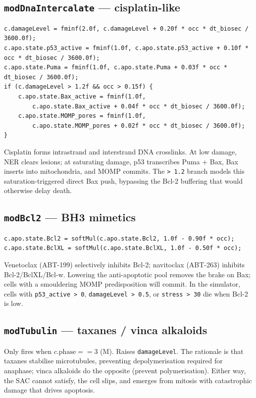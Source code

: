 \documentclass[11pt,letterpaper,twoside,openany]{book}
\newcommand{\code}[1]{\texttt{#1}}
\begin{document}
\subsection{\code{modDnaIntercalate} --- cisplatin-like}

\begin{lstlisting}
c.damageLevel = fminf(2.0f, c.damageLevel + 0.20f * occ * dt_biosec / 3600.0f);
c.apo.state.p53_active = fminf(1.0f, c.apo.state.p53_active + 0.10f * occ * dt_biosec / 3600.0f);
c.apo.state.Puma = fminf(1.0f, c.apo.state.Puma + 0.03f * occ * dt_biosec / 3600.0f);
if (c.damageLevel > 1.2f && occ > 0.15f) {
    c.apo.state.Bax_active = fminf(1.0f,
        c.apo.state.Bax_active + 0.04f * occ * dt_biosec / 3600.0f);
    c.apo.state.MOMP_pores = fminf(1.0f,
        c.apo.state.MOMP_pores + 0.02f * occ * dt_biosec / 3600.0f);
}
\end{lstlisting}
Cisplatin forms intrastrand and interstrand DNA crosslinks. At low
damage, NER clears lesions; at saturating damage, p53 transcribes
Puma + Bax, Bax inserts into mitochondria, and MOMP commits. The
\code{> 1.2} branch models this saturation-triggered direct Bax
push, bypassing the Bcl-2 buffering that would otherwise delay
death.

\subsection{\code{modBcl2} --- BH3 mimetics}

\begin{lstlisting}
c.apo.state.Bcl2 = softMul(c.apo.state.Bcl2, 1.0f - 0.90f * occ);
c.apo.state.BclXL = softMul(c.apo.state.BclXL, 1.0f - 0.50f * occ);
\end{lstlisting}
Venetoclax (ABT-199) selectively inhibits Bcl-2; navitoclax
(ABT-263) inhibits Bcl-2/BclXL/Bcl-w. Lowering the anti-apoptotic
pool removes the brake on Bax; cells with a smouldering MOMP
predisposition will commit. In the simulator, cells with
\code{p53\_active > 0}, \code{damageLevel > 0.5}, or
\code{stress > 30} die when Bcl-2 is low.

\subsection{\code{modTubulin} --- taxanes / vinca alkaloids}

Only fires when $c.\text{phase} == 3$ (M). Raises
\code{damageLevel}. The rationale is that taxanes stabilise
microtubules, preventing depolymerisation required for anaphase;
vinca alkaloids do the opposite (prevent polymerisation). Either
way, the SAC cannot satisfy, the cell slips, and emerges from
mitosis with catastrophic damage that drives apoptosis.
\end{document}
